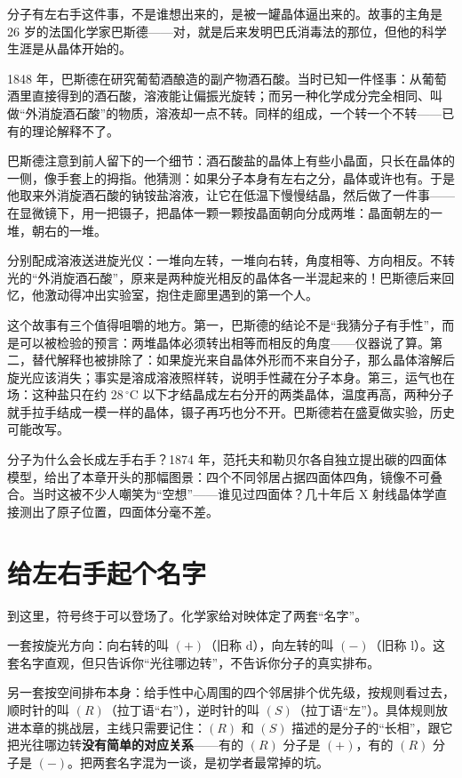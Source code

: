 \begin{zhengju}
分子有左右手这件事，不是谁想出来的，是被一罐晶体逼出来的。故事的主角是 26 岁的法国化学家巴斯德——对，就是后来发明巴氏消毒法的那位，但他的科学生涯是从晶体开始的。

1848 年，巴斯德在研究葡萄酒酿造的副产物酒石酸。当时已知一件怪事：从葡萄酒里直接得到的酒石酸，溶液能让偏振光旋转；而另一种化学成分完全相同、叫做“外消旋酒石酸”的物质，溶液却一点不转。同样的组成，一个转一个不转——已有的理论解释不了。

巴斯德注意到前人留下的一个细节：酒石酸盐的晶体上有些小晶面，只长在晶体的一侧，像手套上的拇指。他猜测：如果分子本身有左右之分，晶体或许也有。于是他取来外消旋酒石酸的钠铵盐溶液，让它在低温下慢慢结晶，然后做了一件事——在显微镜下，用一把镊子，把晶体一颗一颗按晶面朝向分成两堆：晶面朝左的一堆，朝右的一堆。

分别配成溶液送进旋光仪：一堆向左转，一堆向右转，角度相等、方向相反。不转光的“外消旋酒石酸”，原来是两种旋光相反的晶体各一半混起来的！巴斯德后来回忆，他激动得冲出实验室，抱住走廊里遇到的第一个人。

这个故事有三个值得咀嚼的地方。第一，巴斯德的结论不是“我猜分子有手性”，而是可以被检验的预言：两堆晶体必须转出相等而相反的角度——仪器说了算。第二，替代解释也被排除了：如果旋光来自晶体外形而不来自分子，那么晶体溶解后旋光应该消失；事实是溶成溶液照样转，说明手性藏在分子本身。第三，运气也在场：这种盐只在约 $28\,^{\circ}\mathrm{C}$ 以下才结晶成左右分开的两类晶体，温度再高，两种分子就手拉手结成一模一样的晶体，镊子再巧也分不开。巴斯德若在盛夏做实验，历史可能改写。

分子为什么会长成左手右手？1874 年，范托夫和勒贝尔各自独立提出碳的四面体模型，给出了本章开头的那幅图景：四个不同邻居占据四面体四角，镜像不可叠合。当时这被不少人嘲笑为“空想”——谁见过四面体？几十年后 X 射线晶体学直接测出了原子位置，四面体分毫不差。
\end{zhengju}

\section{给左右手起个名字}

到这里，符号终于可以登场了。化学家给对映体定了两套“名字”。

一套按旋光方向：向右转的叫 $(+)$（旧称 d），向左转的叫 $(-)$（旧称 l）。这套名字直观，但只告诉你“光往哪边转”，不告诉你分子的真实排布。

另一套按空间排布本身：给手性中心周围的四个邻居排个优先级，按规则看过去，顺时针的叫 $(R)$（拉丁语“右”），逆时针的叫 $(S)$（拉丁语“左”）。具体规则放进本章的挑战层，主线只需要记住：$(R)$ 和 $(S)$ 描述的是分子的“长相”，跟它把光往哪边转\textbf{没有简单的对应关系}——有的 $(R)$ 分子是 $(+)$，有的 $(R)$ 分子是 $(-)$。把两套名字混为一谈，是初学者最常掉的坑。

